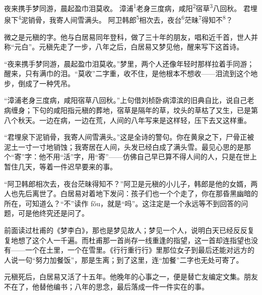 
\begin{poem}
夜来携手梦同游，晨起盈巾泪莫收。
漳浦\textsuperscript{1}老身三度病，咸阳\textsuperscript{2}宿草\textsuperscript{3}八回秋。
君埋泉下\textsuperscript{4}泥销骨，我寄人间雪满头。
阿卫韩郎\textsuperscript{5}相次去，夜台\textsuperscript{6}茫昧\textsuperscript{7}得知不\textsuperscript{8}？
\end{poem}

\begin{annotations}
\end{annotations}

\begin{appreciation}
微之是元稹的字。他与白居易同年登科，做了三十年的朋友，唱和近千首，世人并称“元白”。元稹先走了一步，八年之后，白居易又梦见他，醒来写下这首诗。

“夜来携手梦同游，晨起盈巾泪莫收。”梦里，两个人还像年轻时那样拉着手同游；醒来，只有满巾的泪。“莫收”二字重，收不住，是他根本不想收——泪流到这个地步，倒成了一种凭吊。

“漳浦老身三度病，咸阳宿草八回秋。”上句借刘桢卧病漳滨的旧典自比，说自己老病缠身；下句的咸阳指元稹的葬地，宿草是隔年的草，坟头的草枯了又生，已是第八个秋天。一边在病，一边在荒，人间的八年写来是这样轻，压下去又这样重。

“君埋泉下泥销骨，我寄人间雪满头。”这是全诗的警句。你在黄泉之下，尸骨正被泥土一寸一寸地销蚀；我寄居在人间，头发已经白成了满头雪。最见心思的是那个“寄”字：他不用“活”字，用“寄”——仿佛自己早已算不得人间的人，只是在世上暂住几天，等着一件迟早要来的事。

“阿卫韩郎相次去，夜台茫昧得知不？”阿卫是元稹的小儿子，韩郎是他的女婿，两人也先后离世了。白居易对着地下发问：孩子们也一个个走了，你在那昏黑幽暗的所在，可知道么？“不”读作 fǒu，就是“吗”。这注定是一个永远等不到回答的问题，可是他终究还是问了。

前面读过杜甫的《梦李白》，那也是梦见故人；梦见一个人，说明白天已经反反复复地想了这个人一千遍。而杜甫那一首尚存一线重逢的指望，这一首却连指望也没有——一个在土里，一个在雪里。《行行重行行》里那位女子到最后还能对远方的人说一句“努力加餐饭”，那是生离；到了这里，连“加餐”二字也无处可寄了。

元稹死后，白居易又活了十五年。他晚年的心事之一，便是替亡友编定文集。朋友不在了，他替他编书；八年的思念，最后落成一件一件实在的事。
\end{appreciation}
